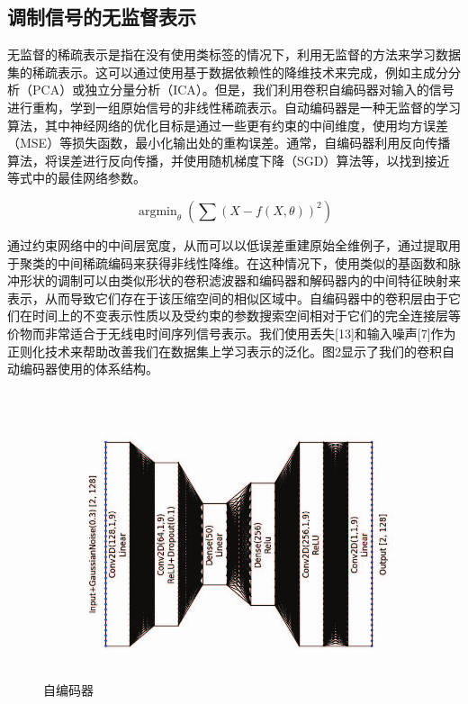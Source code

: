 \subsection{调制信号的无监督表示}

无监督的稀疏表示是指在没有使用类标签的情况下，利用无监督的方法来学习数据集的稀疏表示。这可以通过使用基于数据依赖性的降维技术来完成，例如主成分分析（PCA）或独立分量分析（ICA）。但是，我们利用卷积自编码器对输入的信号进行重构，学到一组原始信号的非线性稀疏表示。自动编码器是一种无监督的学习算法，其中神经网络的优化目标是通过一些更有约束的中间维度，使用均方误差（MSE）等损失函数，最小化输出处的重构误差。通常，自编码器利用反向传播算法，将误差进行反向传播，并使用随机梯度下降（SGD）算法等，以找到接近等式\label{sec:eqt3_3}中的最佳网络参数。

\begin{equation}\label{sec:eqt3_3}
	\mathop{\arg\min}_{\theta}(\sum(X − f (X,\theta))^2)
\end{equation}


通过约束网络中的中间层宽度，从而可以以低误差重建原始全维例子，通过提取用于聚类的中间稀疏编码来获得非线性降维。在这种情况下，使用类似的基函数和脉冲形状的调制可以由类似形状的卷积滤波器和编码器和解码器内的中间特征映射来表示，从而导致它们存在于该压缩空间的相似区域中。自编码器中的卷积层由于它们在时间上的不变表示性质以及受约束的参数搜索空间相对于它们的完全连接层等价物而非常适合于无线电时间序列信号表示。我们使用丢失[13]和输入噪声[7]作为正则化技术来帮助改善我们在数据集上学习表示的泛化。图2显示了我们的卷积自动编码器使用的体系结构。\par
\begin{figure}[!h]
	\centering
	\includegraphics[scale=0.3]{figures/chapter_3/CAE}
	\caption{自编码器}	\label{fig_3_2}
\end{figure}

